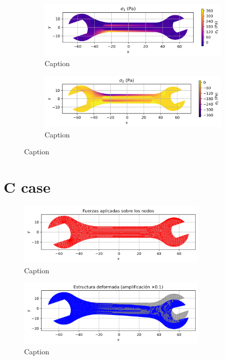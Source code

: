\documentclass{article}  %
\begin{document}
\begin{figure}[H]
  \centering
  \begin{subfigure}[t]{0.49\textwidth}
    \centering
    \includegraphics[width=\textwidth]{GRAFICOS/Case b - sigma_1.png}
    \caption{Caption}
    \label{fig:deformada_reacciones}
  \end{subfigure}
  \hfill
  \begin{subfigure}[t]{0.49\textwidth}
    \centering
    \includegraphics[width=\textwidth]{GRAFICOS/Case b - sigma_2.png}
    \caption{Caption}
    \label{fig:von_mises}
  \end{subfigure}
  \caption{Caption}
  \label{fig:analisis_estructural}
\end{figure}

\section{C case}

\begin{figure}[H]
  \centering
  \includegraphics[width=0.8\textwidth]{GRAFICOS/Case c_fuerzas.png}
  \caption{Caption}
  \label{fig:strain}
\end{figure}

\begin{figure}[H]
  \centering
  \includegraphics[width=0.8\textwidth]{GRAFICOS/Case c_deformada.png}
  \caption{Caption}
  \label{fig:stress}
\end{figure}
\end{document}
